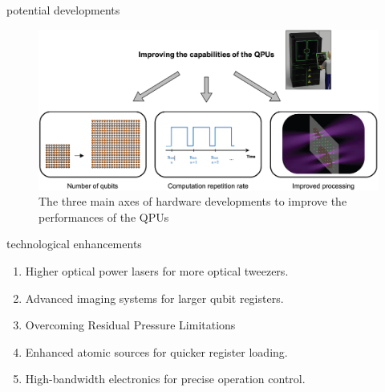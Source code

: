 \documentclass[18 pt]{beamer}
\begin{document}
\begin{frame}{potential developments}
  \begin{figure}
    \centering
    \includegraphics[width=\textwidth]{IMG/improve.png}
    \caption{The three main axes of hardware developments to improve the performances of the QPUs}
  \end{figure}
\end{frame}

\begin{frame}{technological enhancements}
  \begin{enumerate}[itemsep=15pt]
    \item Higher optical power lasers for more optical tweezers.
    \item Advanced imaging systems for larger qubit registers.
    \item Overcoming Residual Pressure Limitations
    \item Enhanced atomic sources for quicker register loading.
    \item High-bandwidth electronics for precise operation control.
  \end{enumerate}
\end{frame}
\end{document}

